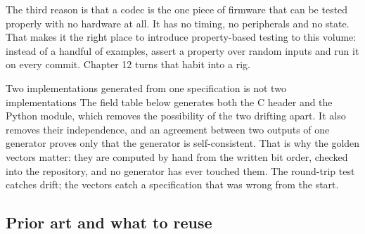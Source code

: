 The third reason is that a codec is the one piece of firmware that can be
tested properly with no hardware at all. It has no timing, no peripherals and
no state. That makes it the right place to introduce property-based testing to
this volume: instead of a handful of examples, assert a property over random
inputs and run it on every commit. Chapter 12 turns that habit into a rig.

\begin{note}{Two implementations generated from one specification is not two implementations}
The field table below generates both the C header and the Python module, which
removes the possibility of the two drifting apart. It also removes their
independence, and an agreement between two outputs of one generator proves only
that the generator is self-consistent. That is why the golden vectors matter:
they are computed by hand from the written bit order, checked into the
repository, and no generator has ever touched them. The round-trip test catches
drift; the vectors catch a specification that was wrong from the start.
\end{note}

\subsection*{Prior art and what to reuse}

